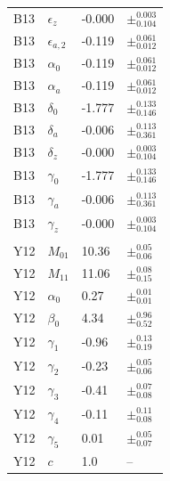 \documentclass[a4paper,fleqn,usenatbib]{mnras}
\begin{document}
\begin{table}
\begin{tabular}{ |p{1.5cm}|p{1.6cm}|p{1.2cm}|p{2cm}}
B13		& $\epsilon_{z}$ 	&  -0.000		& $\pm^{0.003}_{0.104}$ 	\\%
B13		& $\epsilon_{a,2}$ 	&  -0.119		& $\pm^{0.061}_{0.012}$ 	\\%
B13		& $\alpha_{0}$ 		&  -0.119		& $\pm^{0.061}_{0.012}$ 	\\%
B13		& $\alpha_{a}$ 		&  -0.119		& $\pm^{0.061}_{0.012}$ 	\\%
B13		& $\delta_{0}$ 		&  -1.777		& $\pm^{0.133}_{0.146}$ 	\\%
B13		& $\delta_{a}$ 		&  -0.006		& $\pm^{0.113 }_{0.361}$ 	\\%
B13		& $\delta_{z}$ 		&  -0.000		& $\pm^{0.003}_{0.104}$ 	\\%
B13		& $\gamma_{0}$ 	&  -1.777		& $\pm^{0.133}_{0.146}$ 	\\%
B13		& $\gamma_{a}$ 	&  -0.006		& $\pm^{0.113 }_{0.361}$ 	\\%
B13		& $\gamma_{z}$ 	&  -0.000		& $\pm^{0.003}_{0.104}$ 	\\%
\\
Y12		& $M_{01}$ 		&  10.36		& $\pm^{0.05}_{0.06}$	\\%
Y12		& $M_{11}$ 		&  11.06		& $\pm^{0.08}_{0.15}$	\\%
Y12		& $\alpha_{0}$ 		&  0.27 		& $\pm^{0.01}_{0.01}$	\\%
Y12		& $\beta_{0}$ 		&  4.34		& $\pm^{0.96}_{0.52}$	\\%
Y12		& $\gamma_{1}$ 	&  -0.96		& $\pm^{0.13}_{0.19}$ 	\\%
Y12		& $\gamma_{2}$ 	&  -0.23		& $\pm^{0.05 }_{0.06}$ 	\\%
Y12		& $\gamma_{3}$ 	&  -0.41		& $\pm^{0.07}_{0.08}$ 	\\%
Y12		& $\gamma_{4}$ 	&  -0.11		& $\pm^{0.11}_{0.08}$ 	\\%
Y12		& $\gamma_{5}$ 	&  0.01		& $\pm^{0.05 }_{0.07}$ 	\\%
Y12		& $c$ 			&  1.0		& -- 					\\%

\hline
\end{tabular}
\end{table}
\end{document}
